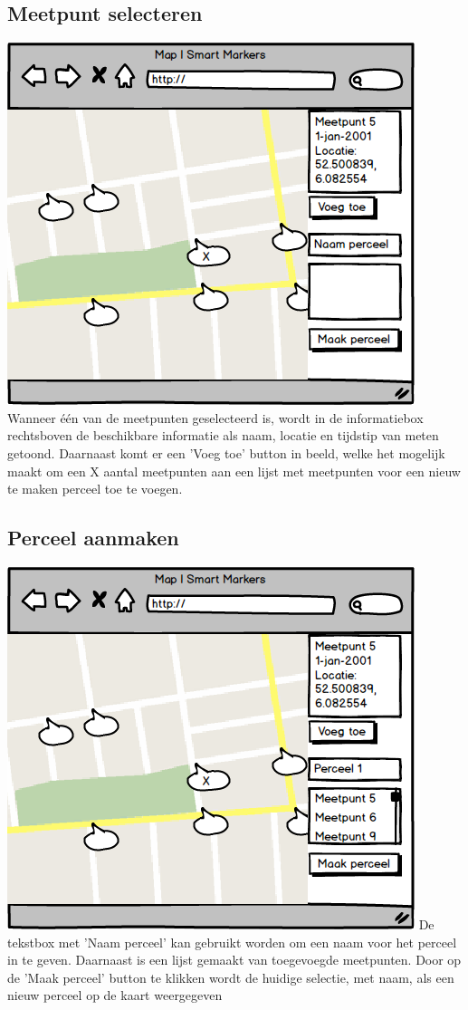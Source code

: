 \subsection*{Meetpunt selecteren}
\includegraphics{functional/map_2.png}
Wanneer één van de meetpunten geselecteerd is, wordt in de informatiebox
rechtsboven de beschikbare informatie als naam, locatie en tijdstip van meten
getoond.
Daarnaast komt er een 'Voeg toe' button in beeld, welke het mogelijk
maakt om een X aantal meetpunten aan een lijst met meetpunten voor een nieuw
te maken perceel toe te voegen.

\subsection*{Perceel aanmaken}
\includegraphics{functional/map_3.png}
De tekstbox met 'Naam perceel' kan gebruikt worden om een naam voor het perceel
in te geven. Daarnaast is een lijst gemaakt van toegevoegde meetpunten. Door op
de 'Maak perceel' button te klikken wordt de huidige selectie, met naam, als een
nieuw perceel op de kaart weergegeven

